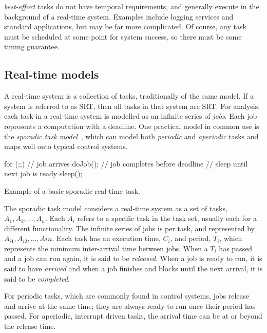 \emph{best-effort} tasks do not have temporal requirements, and generally execute in the
background of a real-time system. Examples include logging services and standard applications, but
may be far more complicated. Of course, any task must be scheduled at some point for system success,
so there must be some timing guarantee. 

\subsection{Real-time models}

A real-time system is a collection of tasks, traditionally of the same model. If a system is
referred to as \gls{SRT}, then all tasks in that system are \gls{SRT}. For analysis, each task in a
real-time system is modelled as an infinite series of \emph{jobs}. Each job represents a computation
with a deadline. 
One practical model in common use is the \emph{sporadic task model}~\citep{Sprunt_SL_89a}, which can
model both \emph{periodic} and \emph{aperiodic} tasks and maps well onto typical control systems. 

\begin{listing}
    \begin{ccode}
for (;;) {
	// job arrives
	doJob();
	// job completes before deadline
    // sleep until next job is ready
    sleep();
}
    \end{ccode}
\caption{Example of a basic sporadic real-time task.}
\label{list:sporadic}
\end{listing}


The sporadic task model considers a real-time system as a set of tasks, $A_{1},A_{2},\ldots,A_{n}$.
Each $A_{i}$ refers to a specific task in the task set, usually each for a different functionality.
The infinite series of jobs is per task, and represented by $A_{i1},A_{i2},\ldots,A{in}$. Each task has
an execution time, $C_{i}$, and period, $T_{i}$, which represents the minimum inter-arrival time
between jobs. When a $T_{i}$ has passed and a job can run again, it is said to be \emph{released}.
When a job is ready to run, it is said to have \emph{arrived} and when a job finishes and blocks until
the next arrival, it is said to be \emph{completed}. 

For periodic tasks, which are commonly found in control systems, jobs release and arrive at the same
time; they are always ready to run once their period has passed. For aperiodic, \ie interrupt driven
tasks, the arrival time can be at or beyond the release time. 

